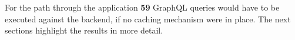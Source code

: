 For the path through the application \textbf{59} GraphQL queries would have to be executed against the backend, if no caching mechanism were in place. The next sections highlight the results in more detail.

\ifshowUnusedContent


